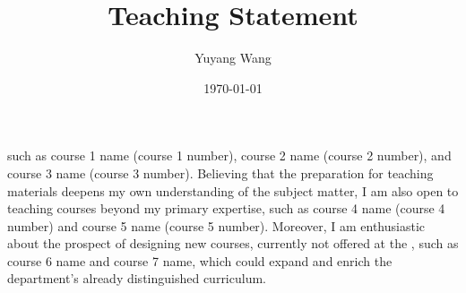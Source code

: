 



\title{Teaching Statement}

\def\courseOneName{course 1 name}
\def\courseOneNumber{course 1 number}
\def\courseTwoName{course 2 name}
\def\courseTwoNumber{course 2 number}
\def\courseThreeName{course 3 name}
\def\courseThreeNumber{course 3 number}
\def\courseFourName{course 4 name}
\def\courseFourNumber{course 4 number}
\def\courseFiveName{course 5 name}
\def\courseFiveNumber{course 5 number}
\def\courseSixName{course 6 name}
\def\courseSixNumber{course 6 number}
\def\courseSevenName{course 7 name}
\def\courseSevenNumber{course 7 number}

\def\rsCustom{%
such as \courseOneName{} (\courseOneNumber{}), \courseTwoName{} (\courseTwoNumber{}), and \courseThreeName{} (\courseThreeNumber{}). Believing that the preparation for teaching materials deepens my own understanding of the subject matter, I am also open to teaching courses beyond my primary expertise, such as \courseFourName{} (\courseFourNumber{}) and \courseFiveName{} (\courseFiveNumber{}). Moreover, I am enthusiastic about the prospect of designing new courses, currently not offered at the \appSchool{}, such as \courseSixName{} and \courseSevenName{}, which could expand and enrich the department's already distinguished curriculum.
}

\author{Yuyang Wang}
\date{\today}
\makeatletter
\fancyfoot[L]{\scshape \MakeLowercase{\@author}}
\fancyfoot[R]{{\scshape \MakeLowercase{\@title}}\quad{\LARGE\sfrac{\thepage}{\pageref*{LastPage}}}}
\makeatother



\maketitle%
\thispagestyle{fancy}


\rsCustom{}


\footnotesize


